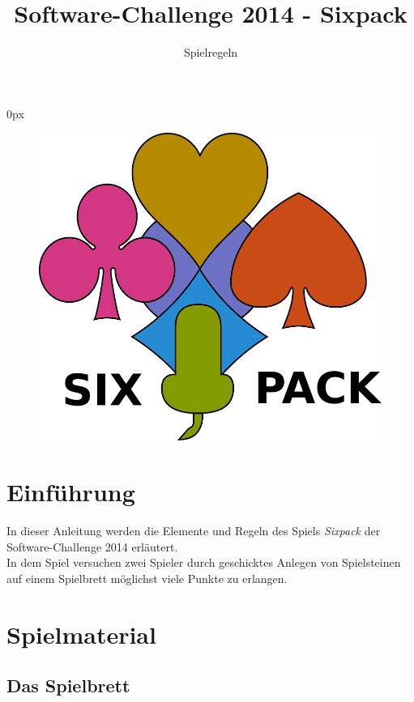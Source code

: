 \documentclass[a4paper, ngerman]{scrartcl}
\title{Software-Challenge 2014 - Sixpack}
\subtitle{Spielregeln}
\begin{document}
\parindent0px
\maketitle

\begin{figure}[h]
	\centering
	\includegraphics[scale = 1.0]{images/sixpack_logo.pdf}
\end{figure}
\vspace*{\fill}

\newpage
\tableofcontents
\newpage

\section{Einführung}
In dieser Anleitung werden die Elemente und Regeln des Spiels \emph{Sixpack}
der Software-Challenge 2014 erläutert.\\
In dem Spiel versuchen zwei Spieler durch geschicktes Anlegen von Spielsteinen auf einem Spielbrett möglichst viele Punkte zu erlangen.

\section{Spielmaterial}
\subsection{Das Spielbrett}
\end{document}
